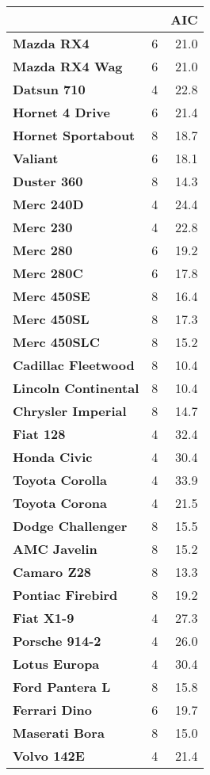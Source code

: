 
\begin{tabular}{>{\bfseries}l|r|r}
\hline
  &  & AIC\\
\hline
Mazda RX4 & 6 & 21.0\\
\hline
Mazda RX4 Wag & 6 & 21.0\\
\hline
Datsun 710 & 4 & 22.8\\
\hline
Hornet 4 Drive & 6 & 21.4\\
\hline
Hornet Sportabout & 8 & 18.7\\
\hline
Valiant & 6 & 18.1\\
\hline
Duster 360 & 8 & 14.3\\
\hline
Merc 240D & 4 & 24.4\\
\hline
Merc 230 & 4 & 22.8\\
\hline
Merc 280 & 6 & 19.2\\
\hline
Merc 280C & 6 & 17.8\\
\hline
Merc 450SE & 8 & 16.4\\
\hline
Merc 450SL & 8 & 17.3\\
\hline
Merc 450SLC & 8 & 15.2\\
\hline
Cadillac Fleetwood & 8 & 10.4\\
\hline
Lincoln Continental & 8 & 10.4\\
\hline
Chrysler Imperial & 8 & 14.7\\
\hline
Fiat 128 & 4 & 32.4\\
\hline
Honda Civic & 4 & 30.4\\
\hline
Toyota Corolla & 4 & 33.9\\
\hline
Toyota Corona & 4 & 21.5\\
\hline
Dodge Challenger & 8 & 15.5\\
\hline
AMC Javelin & 8 & 15.2\\
\hline
Camaro Z28 & 8 & 13.3\\
\hline
Pontiac Firebird & 8 & 19.2\\
\hline
Fiat X1-9 & 4 & 27.3\\
\hline
Porsche 914-2 & 4 & 26.0\\
\hline
Lotus Europa & 4 & 30.4\\
\hline
Ford Pantera L & 8 & 15.8\\
\hline
Ferrari Dino & 6 & 19.7\\
\hline
Maserati Bora & 8 & 15.0\\
\hline
Volvo 142E & 4 & 21.4\\
\hline
\end{tabular}
